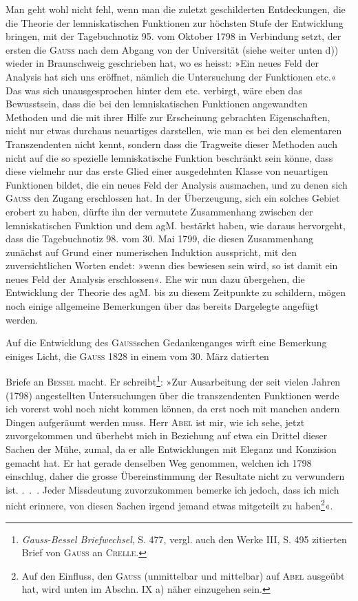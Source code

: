 Man geht wohl nicht fehl, wenn man die zuletzt geschilderten Entdeckungen,
die die Theorie der lemniskatischen Funktionen zur höchsten
Stufe der Entwicklung bringen, mit der Tagebuchnotiz 95. vom Oktober
1798 in Verbindung setzt, der ersten die \textsc{Gauss} nach dem Abgang von
der Universität (siehe weiter unten d)) wieder in Braunschweig geschrieben
hat, wo es heisst: »Ein neues Feld der Analysis hat sich uns eröffnet, nämlich
die Untersuchung der Funktionen etc.« Das was sich unausgesprochen
hinter dem etc. verbirgt, wäre eben das Bewusstsein, dass die bei den lemniskatischen
Funktionen angewandten Methoden und die mit ihrer Hilfe zur
Erscheinung gebrachten Eigenschaften, nicht nur etwas durchaus neuartiges
darstellen, wie man es bei den elementaren Transzendenten nicht kennt, sondern
dass die Tragweite dieser Methoden auch nicht auf die so spezielle
lemniskatische Funktion beschränkt sein könne, dass diese vielmehr nur das
erste Glied einer ausgedehnten Klasse von neuartigen Funktionen bildet, die
ein neues Feld der Analysis ausmachen, und zu denen sich \textsc{Gauss} den Zugang
erschlossen hat. In der Überzeugung, sich ein solches Gebiet erobert zu haben,
dürfte ihn der vermutete Zusammenhang zwischen der lemniskatischen Funktion
und dem agM. bestärkt haben, wie daraus hervorgeht, dass die Tagebuchnotiz
98. vom 30. Mai 1799, die diesen Zusammenhang zunächst auf
Grund einer numerischen Induktion ausspricht, mit den zuversichtlichen Worten
endet: »wenn dies bewiesen sein wird, so ist damit  ein neues Feld
der Analysis erschlossen«. Ehe wir nun dazu übergehen, die Entwicklung
der Theorie des agM. bis zu diesem Zeitpunkte zu schildern, mögen noch
einige allgemeine Bemerkungen über das bereits Dargelegte angefügt werden.

Auf die Entwicklung des \textsc{Gauss}schen Gedankenganges wirft eine Bemerkung
einiges Licht, die \textsc{Gauss} 1828 in einem vom 30. März datierten\par
\clearpage{}
\noindent Briefe an \textsc{Bessel} macht. Er schreibt\footnote{\textit{Gauss-Bessel Briefwechsel}, S. 477, vergl. auch den Werke III, S. 495 zitierten Brief von \textsc{Gauss}
an \textsc{Crelle}.}: »Zur Ausarbeitung der seit vielen
Jahren (1798) angestellten Untersuchungen über die transzendenten Funktionen
werde ich vorerst wohl noch nicht kommen können, da erst noch mit manchen
andern Dingen aufgeräumt werden muss. Herr \textsc{Abel} ist mir, wie ich sehe,
jetzt zuvorgekommen und überhebt mich in Beziehung auf etwa ein Drittel
dieser Sachen der Mühe, zumal, da er alle Entwicklungen mit Eleganz und
Konzision gemacht hat. Er hat gerade denselben Weg genommen, welchen
ich 1798 einschlug, daher die grosse Übereinstimmung der Resultate nicht zu
verwundern ist. .\ .\ . Jeder Missdeutung zuvorzukommen bemerke ich jedoch,
dass ich mich nicht erinnere, von diesen Sachen irgend jemand etwas mitgeteilt
zu haben\footnote{Auf den Einfluss, den \textsc{Gauss} (unmittelbar und mittelbar) auf \textsc{Abel} ausgeübt hat, wird unten
im Abschn. IX a) näher einzugehen sein.}«.


